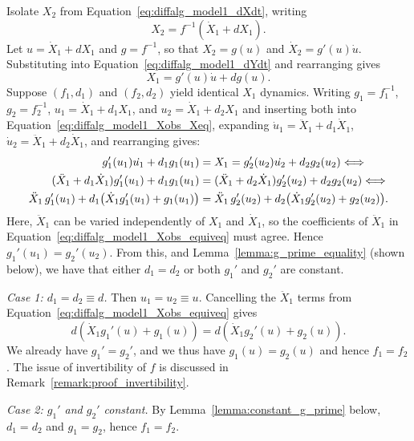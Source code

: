 \documentclass{article}
\theoremstyle{plain}
\theoremstyle{definition}
\begin{document}
{Isolate $X_2$ from Equation~\eqref{eq:diffalg_model1_dXdt}, writing
\begin{equation*}
    X_2 = f^{-1}(\dot{X}_1 + dX_1).
\end{equation*}
Let $u = \dot{X}_1 + dX_1$ and $g = f^{-1}$, so that $X_2 = g(u)$ and $\dot{X}_2 = g'(u)\dot{u}$. Substituting into Equation~\eqref{eq:diffalg_model1_dYdt} and rearranging gives
\begin{equation}
    \label{eq:diffalg_model1_Xobs_Xeq}
    X_1 = g'(u)\dot{u} + dg(u).
\end{equation}
Suppose $(f_1,d_1)$ and $(f_2,d_2)$ yield identical $X_1$ dynamics. Writing $g_1 = f_1^{-1}$, $g_2 = f_2^{-1}$, $u_1 = \dot{X}_1 + d_1 X_1$, and $u_2 = \dot{X}_1 + d_2 X_1$ and inserting both into Equation~\eqref{eq:diffalg_model1_Xobs_Xeq}, expanding $\dot{u}_1 = \ddot{X}_1 + d_1\dot{X}_1$, $\dot{u}_2 = \ddot{X}_1 + d_2\dot{X}_1$, and rearranging gives:
\begin{align}
    \label{eq:diffalg_model1_Xobs_equiveq}
    g_1'(u_1)\dot{u_1} + d_1g_1(u_1) &= X_1 = g_2'(u_2)\dot{u_2} + d_2g_2(u_2) \notag \Longleftrightarrow \\
    (\ddot{X}_1 + d_1\dot{X}_1)g_1'(u_1) + d_1g_1(u_1) &= (\ddot{X}_1 + d_2\dot{X}_1)g_2'(u_2) + d_2g_2(u_2) \notag \Longleftrightarrow \\
    \ddot{X}_1\,g_1'(u_1) + d_1\bigl(\dot{X}_1g_1'(u_1) + g_1(u_1)\bigr) &=  \ddot{X}_1\,g_2'(u_2) + d_2\bigl(\dot{X}_1g_2'(u_2) + g_2(u_2)\bigr).
\end{align}
Here, $\ddot{X}_1$ can be varied independently of $X_1$ and $\dot{X}_1$, so the coefficients of $\ddot{X}_1$ in Equation~\eqref{eq:diffalg_model1_Xobs_equiveq} must agree. Hence $g_1'(u_1) = g_2'(u_2)$. From this, and Lemma~\ref{lemma:g_prime_equality} (shown below), we have that either $d_1 = d_2$ or both $g_1'$ and $g_2'$ are constant.

\medskip\noindent
\textit{Case 1: $d_1 = d_2 \equiv d$.} Then $u_1 = u_2 \equiv u$. Cancelling the $\ddot{X}_1$ terms from Equation~\eqref{eq:diffalg_model1_Xobs_equiveq} gives 
\begin{equation*}
    d(\dot{X}_1g_1'(u) + g_1(u)) = d(\dot{X}_1g_2'(u) + g_2(u)).
\end{equation*}
We already have $g_1' = g_2'$, and we thus have $g_1(u) = g_2(u)$ and hence $f_1 = f_2$. The issue of invertibility of $f$ is discussed in Remark~\ref{remark:proof_invertibility}.

\medskip\noindent
\textit{Case 2: $g_1'$ and $g_2'$ constant.} By Lemma~\ref{lemma:constant_g_prime} below, $d_1 = d_2$ and $g_1 = g_2$, hence $f_1 = f_2$.

}
\end{document}
